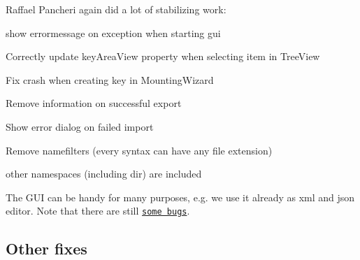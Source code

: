 Raffael Pancheri again did a lot of stabilizing work\+:


\begin{DoxyItemize}
\item show errormessage on exception when starting gui
\item Correctly update key\+Area\+View property when selecting item in Tree\+View
\item Fix crash when creating key in Mounting\+Wizard
\item Remove information on successful export
\item Show error dialog on failed import
\item Remove namefilters (every syntax can have any file extension)
\item other namespaces (including dir) are included
\end{DoxyItemize}

The G\+UI can be handy for many purposes, e.\+g. we use it already as xml and json editor. Note that there are still \href{https://git.libelektra.org/issues}{\tt some bugs}.

\subsection*{Other fixes}


